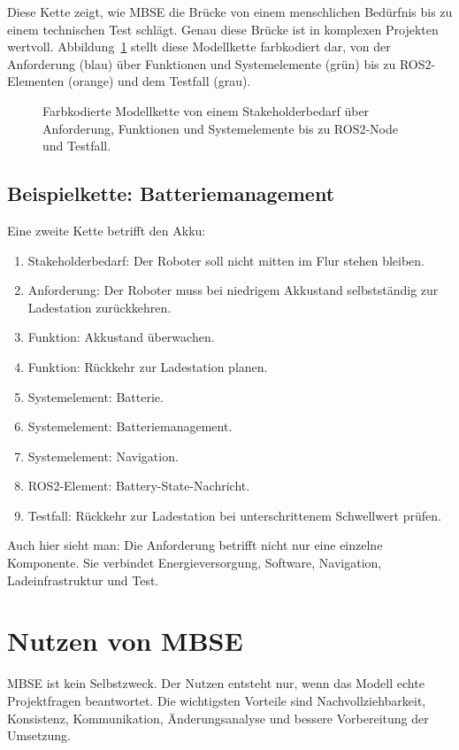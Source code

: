 Diese Kette zeigt, wie MBSE die Brücke von einem menschlichen Bedürfnis bis zu einem technischen Test schlägt. Genau diese Brücke ist in komplexen Projekten wertvoll. Abbildung~\ref{fig:kap02-modellkette-traceability} stellt diese Modellkette farbkodiert dar, von der Anforderung (blau) über Funktionen und Systemelemente (grün) bis zu ROS2-Elementen (orange) und dem Testfall (grau).

\begin{figure}[H]
  \centering
  \caption{Farbkodierte Modellkette von einem Stakeholderbedarf über Anforderung, Funktionen und Systemelemente bis zu ROS2-Node und Testfall.}
  \label{fig:kap02-modellkette-traceability}
\end{figure}

\subsection{Beispielkette: Batteriemanagement}
Eine zweite Kette betrifft den Akku:

\begin{enumerate}
    \item Stakeholderbedarf: Der Roboter soll nicht mitten im Flur stehen bleiben.
    \item Anforderung: Der Roboter muss bei niedrigem Akkustand selbstständig zur Ladestation zurückkehren.
    \item Funktion: Akkustand überwachen.
    \item Funktion: Rückkehr zur Ladestation planen.
    \item Systemelement: Batterie.
    \item Systemelement: Batteriemanagement.
    \item Systemelement: Navigation.
    \item ROS2-Element: Battery-State-Nachricht.
    \item Testfall: Rückkehr zur Ladestation bei unterschrittenem Schwellwert prüfen.
\end{enumerate}

Auch hier sieht man: Die Anforderung betrifft nicht nur eine einzelne Komponente. Sie verbindet Energieversorgung, Software, Navigation, Ladeinfrastruktur und Test.

\section{Nutzen von MBSE}
MBSE ist kein Selbstzweck. Der Nutzen entsteht nur, wenn das Modell echte Projektfragen beantwortet. Die wichtigsten Vorteile sind Nachvollziehbarkeit, Konsistenz, Kommunikation, Änderungsanalyse und bessere Vorbereitung der Umsetzung.

